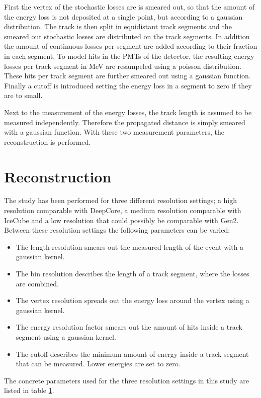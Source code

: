 First the vertex of the stochastic losses are is smeared out, so that the amount of the energy loss is not deposited at a single point, but according to a gaussian distribution.
The track is then split in equidistant track segments and the smeared out stochastic losses are distributed on the track segments.
In addition the amount of continuous losses per segment are added according to their fraction in each segment.
To model hits in the PMTs of the detector, the resulting energy losses per track segment in MeV are resampeled using a poisson distribution.
These hits per track segment are further smeared out using a gaussian function.
Finally a cutoff is introduced setting the energy loss in a segment to zero if they are to small.

Next to the measurement of the energy losses, the track length is assumed to be measured independently.
Therefore the propagated distance is simply smeared with a gaussian function.
With these two measurement parameters, the reconstruction is performed.

\section{Reconstruction}

The study has been performed for three different resolution settings;
a high resolution comparable with DeepCore, a medium resolution comparable with IceCube and a low resolution that could possibly be comparable with Gen2.
Between these resolution settings the following parameters can be varied:
\begin{itemize}
    \item The length resolution smears out the measured length of the event with a gaussian kernel.
    \item The bin resolution describes the length of a track segment, where the losses are combined.
    \item The vertex resolution spreads out the energy loss around the vertex using a gaussian kernel.
    \item The energy resolution factor smears out the amount of hits inside a track segment using a gaussian kernel.
    \item The cutoff describes the minimum amount of energy inside a track segment that can be measured. Lower energies are set to zero.
\end{itemize}
The concrete parameters used for the three resolution settings in this study are listed in table \ref{}.

